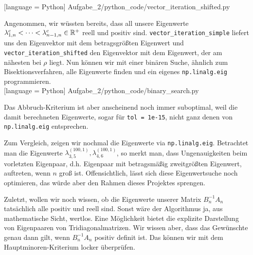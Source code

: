 
[language = Python]
{Aufgabe_2/python_code/vector_iteration_shifted.py}
\vspace{10pt}

Angenommen, wir wüssten bereits, dass all unsere Eigenwerte $\lambda_{1, n}^c < \cdots < \lambda_{n-1, n}^c \in \mathbb{R}^+$ reell und positiv sind. \verb|vector_iteration_simple| liefert uns den Eigenvektor mit dem betragsgrößten Eigenwert und \verb|vector_iteration_shifted| den Eigenvektor mit dem Eigenwert, der am nähesten bei $\rho$ liegt. Nun können wir mit einer binären Suche, ähnlich zum Bisektionsverfahren, alle Eigenwerte finden und ein eigenes \verb|np.linalg.eig| programmieren. \\


[language = Python]
{Aufgabe_2/python_code/binary_search.py}
\vspace{10pt}

Das Abbruch-Kriterium ist aber anscheinend noch immer suboptimal, weil die damit berechneten Eigenwerte, sogar für \verb|tol = 1e-15|, nicht ganz denen von \verb|np.linalg.eig| entsprechen. \\

\begin{center}

\vspace{10pt}
\end{center}

Zum Vergleich, zeigen wir nochmal die Eigenwerte via \verb|np.linalg.eig|. Betrachtet man die Eigenwerte $\lambda_{3, 5}^{(100, 1)}, \lambda_{4, 6}^{(100, 1)}$, so merkt man, dass Ungenauigkeiten beim vorletzten Eigenpaar, d.h. Eigenpaar mit betragsmäßig zweitgrößten Eigenwert, auftreten, wenn $n$ groß ist. Offensichtlich, lässt sich diese Eigenwertsuche noch optimieren, das würde aber den Rahmen dieses Projektes sprengen. \\

\begin{center}

\vspace{10pt}
\end{center}

Zuletzt, wollen wir noch wissen, ob die Eigenwerte unserer Matrix $B_n^{-1} A_n$ tatsächlich alle positiv und reell sind. Sonst wäre der Algorithmus ja, aus mathematische Sicht, wertlos. Eine Möglichkeit bietet die explizite Darstellung von Eigenpaaren von Tridiagonalmatrizen. Wir wissen aber, dass das Gewünschte genau dann gilt, wenn $B_n^{-1} A_n$ positiv definit ist. Das können wir mit dem Hauptminoren-Kriterium locker überprüfen.

